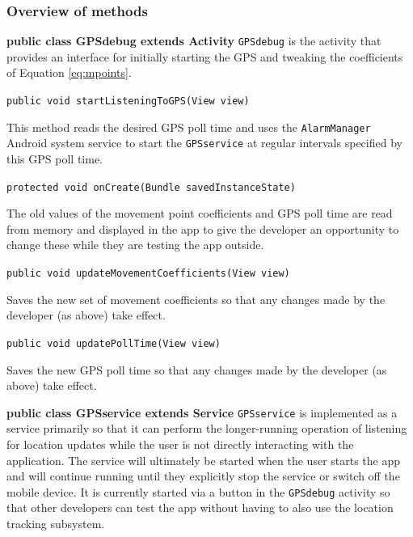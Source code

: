 \documentclass[12pt,a4paper,twoside]{article}
\begin{document}
\subsubsection{Overview of methods}
\textbf{public class GPSdebug extends Activity}\newline
\verb=GPSdebug= is the activity that provides an interface for initially starting the GPS and tweaking the coefficients of Equation \ref{eq:mpoints}.


\verb=public void startListeningToGPS(View view)=
\begin{myindentpar}{1cm}
This method reads the desired GPS poll time and uses the \verb=AlarmManager= Android system service to start the \verb=GPSservice= at regular intervals specified by this GPS poll time.
\end{myindentpar}

\verb=protected void onCreate(Bundle savedInstanceState)=
\begin{myindentpar}{1cm}
The old values of the movement point coefficients and GPS poll time are read from memory and displayed in the app to give the developer an opportunity to change these while they are testing the app outside.
\end{myindentpar}

\verb=public void updateMovementCoefficients(View view)=
\begin{myindentpar}{1cm}
Saves the new set of movement coefficients so that any changes made by the developer (as above) take effect.
\end{myindentpar}

\verb=public void updatePollTime(View view)=
\begin{myindentpar}{1cm}
Saves the new GPS poll time so that any changes made by the developer (as above) take effect.
\end{myindentpar}

\textbf{public class GPSservice extends Service}\newline
\verb=GPSservice= is implemented as a service primarily so that it can perform the longer-running operation of listening for location updates while the user is not directly interacting with the application. The service will ultimately be started when the user starts the app and will continue running until they explicitly stop the service or switch off the mobile device. It is currently started via a button in the \verb=GPSdebug= activity so that other developers can test the app without having to also use the location tracking subsystem.
\end{document}
